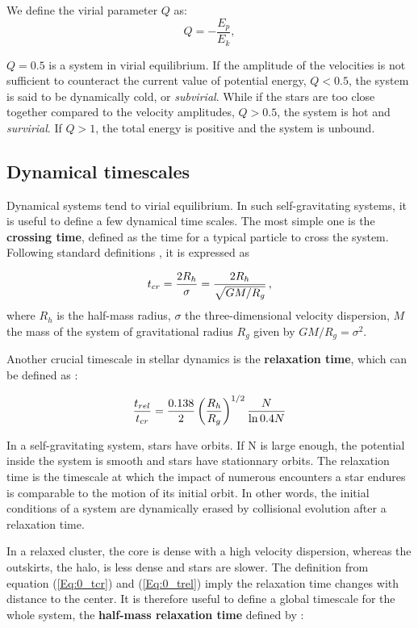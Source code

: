 We define the virial parameter $Q$ as:
\begin{equation}
Q = - \frac{E_p}{E_k},
\end{equation}

$Q=0.5$ is a system in virial equilibrium. If the amplitude of the velocities is not sufficient to counteract the current value of potential energy, $Q<0.5$, the system is said to be dynamically cold, or \textit{subvirial}. While if the stars are too close together compared to the velocity amplitudes, $Q>0.5$, the system is hot and \textit{survirial}. If $Q>1$, the total energy is positive and the system is unbound. 


\subsection{Dynamical timescales}

Dynamical systems tend to virial equilibrium. In such self-gravitating systems, it is useful to define a few dynamical time scales. The most simple one is the \textbf{crossing time}, defined as the time for a typical particle to cross the system. Following standard definitions \citep{Meylan1997,Fleck2006}, it is expressed as 

\begin{equation}
\label{Eq:0_tcr}
     t_{cr} = \frac{2R_h}{\sigma} = \frac{2 R_h}{\sqrt{GM/R_g} } \, ,
\end{equation}
where $R_h$ is the half-mass radius, $\sigma$ the three-dimensional velocity dispersion, $M$ the mass of the system of gravitational radius $R_g$ given by $GM / R_g = \sigma^2$. 

Another crucial timescale in stellar dynamics is the \textbf{relaxation time}, which can be defined as \citep{Heggie2003}:

\begin{equation} 
\label{Eq:0_trel}
\frac{t_{rel}}{t_{cr}} = \frac{0.138}{2} \left(\frac{R_h}{R_g}\right)^{1/2} \frac{N}{\ln 0.4 N}  
\end{equation}

In a self-gravitating system, stars have orbits. If N is large enough, the potential inside the system is smooth and stars have stationnary orbits. The relaxation time is the timescale at which the impact of numerous encounters a star endures is comparable to the motion of its initial orbit. In other words, the initial conditions of a system are dynamically erased by collisional evolution after a relaxation time.

In a relaxed cluster, the core is dense with a high velocity dispersion, whereas the outskirts, the halo, is less dense and stars are slower. The definition from equation (\ref{Eq:0_tcr}) and (\ref{Eq:0_trel}) imply the relaxation time changes with distance to the center. It is therefore useful to define a global timescale for the whole system, the \textbf{half-mass relaxation time} defined by \cite{Heggie2003}:


